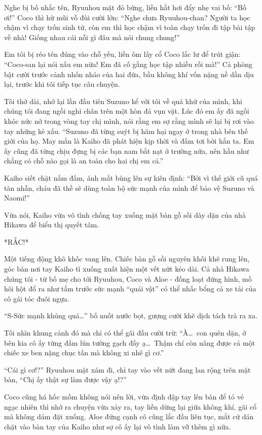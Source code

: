 ﻿\documentclass[../main.tex]{subfiles}
\begin{document}
Nghe bị bố nhắc tên, Ryuuhou mặt đỏ bừng, liền hắt hơi đẩy nhẹ vai bố: ``Bố ơi!'' Coco thì hừ mũi vỗ đùi cười lớn: ``Nghe chưa Ryuuhou-chan? Người ta học chậm vì chạy trốn sinh tử, còn em thì học chậm vì toàn chạy trốn đi tập bài tập về nhà! Giống nhau cái nỗi gì đâu mà nói chung chung!''

Em tôi bị réo tên đúng vào chỗ yếu, liền ôm lấy cổ Coco lắc lư để trút giận: ``Coco-san lại nói xấu em nữa! Em đã cố gắng học tập nhiều rồi mà!'' Cả phòng bật cười trước cảnh nhốn nháo của hai đứa, bầu không khí vốn nặng nề dần dịu lại, trước khi tôi tiếp tục câu chuyện.

Tôi thở dài, nhớ lại lần đầu tiên Suzuno kể với tôi về quá khứ của mình, khi chúng tôi đang ngồi nghỉ chân trên một hòn đá vụn vặt. Lúc đó em ấy đã ngồi khóc nức nở trong vòng tay chị mình, nói rằng em sợ rằng mình sẽ lại bị rơi vào tay những kẻ xấu. ``Suzuno đã từng suýt bị hãm hại ngay ở trong nhà bên thế giới của họ. May mắn là Kaiho đã phát hiện kịp thời và đấm tơi bời hắn ta. Em ấy cũng đã từng chịu đựng bị các bạn nam bắt nạt ở trường nữa, nên hầu như chẳng có chỗ nào gọi là an toàn cho hai chị em cả.''

Kaiho siết chặt nắm đấm, ánh mắt bùng lên sự kiên định: ``Bởi vì thế giới cũ quá tàn nhẫn, cháu đã thề sẽ dùng toàn bộ sức mạnh của mình để bảo vệ Suzuno và Naomi!''

Vừa nói, Kaiho vừa vô tình chống tay xuống mặt bàn gỗ sồi dày dặn của nhà Hikawa để biểu thị quyết tâm.

*RẮC!*

Một tiếng động khô khốc vang lên. Chiếc bàn gỗ sồi nguyên khối khẽ rung lên, góc bàn nơi tay Kaiho tì xuống xuất hiện một vết nứt kéo dài. Cả nhà Hikawa chúng tôi - từ bố mẹ cho tới Ryuuhou, Coco và Aloe - đồng loạt đứng hình, mồ hôi hột đổ ra như tắm trước sức mạnh ``quái vật'' có thể nhấc bổng cả xe tải của cô gái tóc đuôi ngựa.

``S-Sức mạnh khủng quá\dots'' bố nuốt nước bọt, gượng cười khẽ dịch tách trà ra xa.

Tôi nhìn khung cảnh đó mà chỉ có thể gãi đầu cười trừ: ``À\dots\ con quên dặn, ở bên kia cô ấy từng đấm lún tường gạch đấy ạ\dots\ Thậm chí còn nâng được cả một chiếc xe ben nặng chục tấn mà không xi nhê gì cơ.''

``Cái gì cơ!?'' Ryuuhou mặt xám đi, chỉ tay vào vết nứt đang lan rộng trên mặt bàn, ``Chị ấy thật sự làm được vậy ạ!?''

Coco cũng há hốc mồm không nói nên lời, vừa định đập tay lên bàn để tỏ vẻ ngạc nhiên thì nhớ ra chuyện vừa xảy ra, tay liền dừng lại giữa không khí, gãi cổ mà không dám đặt xuống. Aloe đứng cạnh cô cũng lắc đầu liên tục, mắt cứ dán chặt vào bàn tay của Kaiho như sợ cô ấy lại vô tình làm vỡ thêm gì nữa.
\end{document}
